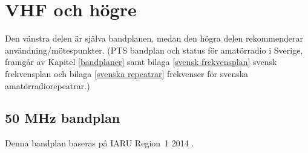 \onecolumn

\section{VHF och högre}
\label{Bandplan VHF och högre}

Den vänstra delen är själva bandplanen, medan den högra delen rekommenderar
användning/mötespunkter.
(PTS bandplan och status för amatörradio i Sverige, framgår av Kapitel
\ref{bandplaner} samt bilaga \ref{svensk frekvensplan} svensk frekvensplan och
bilaga \ref{svenska repeatrar} frekvenser för svenska amatörradiorepeatrar.)

\subsection{50 MHz bandplan}
\label{50MHZbandplan}
Denna bandplan baseras på IARU Region~1 2014 \cite{IARU1}.

